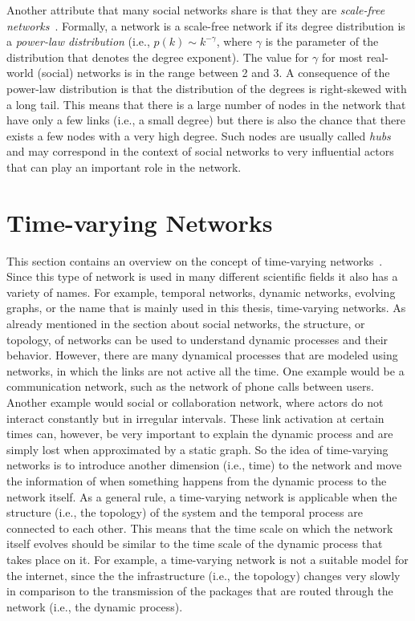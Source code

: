 Another attribute that many social networks share is that they are \emph{scale-free networks}~\cite{Barabasi2016}.
Formally, a network is a scale-free network if its degree distribution is a \emph{power-law distribution} (i.e., \(p(k) \sim k^{-\gamma}\), where \(\gamma\) is the parameter of the distribution that denotes the degree exponent).
The value for \(\gamma\) for most real-world (social) networks is in the range between 2 and 3.
A consequence of the power-law distribution is that the distribution of the degrees is right-skewed with a long tail.
This means that there is a large number of nodes in the network that have only a few links (i.e., a small degree) but there is also the chance that there exists a few nodes with a very high degree.
Such nodes are usually called \emph{hubs} and may correspond in the context of social networks to very influential actors that can play an important role in the network.




\section{Time-varying Networks}
\label{sec:time-varying-networks}

This section contains an overview on the concept of time-varying networks~\cite{Holme2012, Holme2015}.
Since this type of network is used in many different scientific fields it also has a variety of names.
For example, temporal networks, dynamic networks, evolving graphs, or the name that is mainly used in this thesis, time-varying networks.
As already mentioned in the section about social networks, the structure, or topology, of networks can be used to understand dynamic processes and their behavior.
However, there are many dynamical processes that are modeled using networks, in which the links are not active all the time.
One example would be a communication network, such as the network of phone calls between users.
Another example would social or collaboration network, where actors do not interact constantly but in irregular intervals.
These link activation at certain times can, however, be very important to explain the dynamic process and are simply lost when approximated by a static graph.
So the idea of time-varying networks is to introduce another dimension (i.e., time) to the network and move the information of when something happens from the dynamic process to the network itself.
As a general rule, a time-varying network is applicable when the structure (i.e., the topology) of the system and the temporal process are connected to each other.
This means that the time scale on which the network itself evolves should be similar to the time scale of the dynamic process that takes place on it.
For example, a time-varying network is not a suitable model for the internet, since the the infrastructure (i.e., the topology) changes very slowly in comparison to the transmission of the packages that are routed through the network (i.e., the dynamic process).

